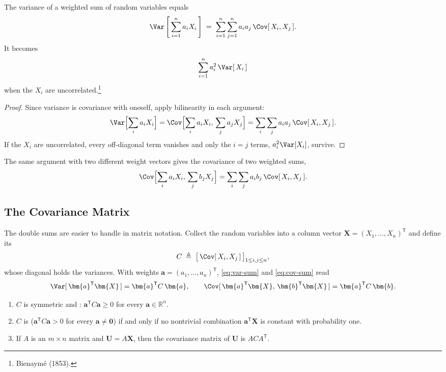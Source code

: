 \begin{proposition}
	The variance of a weighted sum of random variables equals
	\begin{equation}
		\Var\left[\,\sum_{i=1}^{n} a_{i}X_{i}\,\right]
		\;=\; \sum_{i=1}^{n}\sum_{j=1}^{n} a_{i}a_{j}\,\Cov[\,X_{i},X_{j}\,] . \label{eq:var-sum}
	\end{equation}
	It becomes
	\begin{equation}
		\sum_{i=1}^{n} a_{i}^{2}\,\Var[\,X_{i}\,] \label{eq:var-sum-uncorr}
	\end{equation}
	when the $X_{i}$ are uncorrelated.\footnote{Bienaym\'e (1853).}
\end{proposition}

\suppstart
\begin{proof}
	Since variance is covariance with oneself, apply bilinearity in each argument:
	\[
		\Var\Bigl[\sum_{i}a_{i}X_{i}\Bigr]
		= \Cov\Bigl[\sum_{i}a_{i}X_{i},\,\sum_{j}a_{j}X_{j}\Bigr]
		= \sum_{i}\sum_{j} a_{i}a_{j}\,\Cov[\,X_{i},X_{j}\,] .
	\]
	If the $X_{i}$ are uncorrelated, every off-diagonal term vanishes and only the $i=j$ terms, $a_{i}^{2}\Var[X_{i}]$, survive.
\end{proof}

The same argument with two different weight vectors gives the covariance of two weighted sums,
\begin{equation}
	\Cov\Bigl[\sum_{i}a_{i}X_{i},\,\sum_{j}b_{j}X_{j}\Bigr] = \sum_{i}\sum_{j}a_{i}b_{j}\,\Cov[\,X_{i},X_{j}\,] . \label{eq:cov-sum}
\end{equation}

\subsection{The Covariance Matrix}

The double sums are easier to handle in matrix notation.
Collect the random variables into a column vector $\bm{X}=(X_{1},\dots,X_{n})^{\mathsf{T}}$ and define its 
\[
	C \;\triangleq\; \bigl[\,\Cov[\,X_{i},X_{j}\,]\,\bigr]_{1\le i,j\le n} ,
\]
whose diagonal holds the variances.
With weights $\bm{a}=(a_{1},\dots,a_{n})^{\mathsf{T}}$, \eqref{eq:var-sum} and \eqref{eq:cov-sum} read
\[
	\Var[\,\bm{a}^{\mathsf{T}}\bm{X}\,]=\bm{a}^{\mathsf{T}}C\,\bm{a} ,
	\qquad
	\Cov[\,\bm{a}^{\mathsf{T}}\bm{X},\,\bm{b}^{\mathsf{T}}\bm{X}\,]=\bm{a}^{\mathsf{T}}C\,\bm{b} .
\]

\begin{proposition}\label{prop:cov-matrix}
	\begin{enumerate}[nosep]
		\item $C$ is symmetric and : $\bm{a}^{\mathsf{T}}C\bm{a}\ge0$ for every $\bm{a}\in\mathbb{R}^{n}$.
		\item $C$ is  ($\bm{a}^{\mathsf{T}}C\bm{a}>0$ for every $\bm{a}\ne\bm{0}$) if and only if no nontrivial combination $\bm{a}^{\mathsf{T}}\bm{X}$ is constant with probability one.
		\item If $A$ is an $m\times n$ matrix and $\bm{U}=A\bm{X}$, then the covariance matrix of $\bm{U}$ is $AC A^{\mathsf{T}}$.
	\end{enumerate}
\end{proposition}

